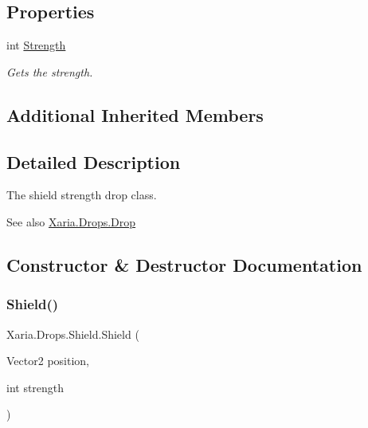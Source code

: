 \subsection*{Properties}
\begin{DoxyCompactItemize}
\item 
int \hyperlink{classXaria_1_1Drops_1_1Shield_aa27eea9b5a8f9352752e052869d3f3d2}{Strength}
\begin{DoxyCompactList}\small\item\em Gets the strength. \end{DoxyCompactList}\end{DoxyCompactItemize}
\subsection*{Additional Inherited Members}


\subsection{Detailed Description}
The shield strength drop class. 

\begin{DoxySeeAlso}{See also}
\hyperlink{classXaria_1_1Drops_1_1Drop}{Xaria.\+Drops.\+Drop}


\end{DoxySeeAlso}


\subsection{Constructor \& Destructor Documentation}
\mbox{\label{classXaria_1_1Drops_1_1Shield_a0902539852e51ea1b6e167d7ff1802ca}} 
\subsubsection{\texorpdfstring{Shield()}{Shield()}}
{\footnotesize\ttfamily Xaria.\+Drops.\+Shield.\+Shield (\begin{DoxyParamCaption}\item[{Vector2}]{position,  }\item[{int}]{strength }\end{DoxyParamCaption})\hspace{0.3cm}{\ttfamily [inline]}}



